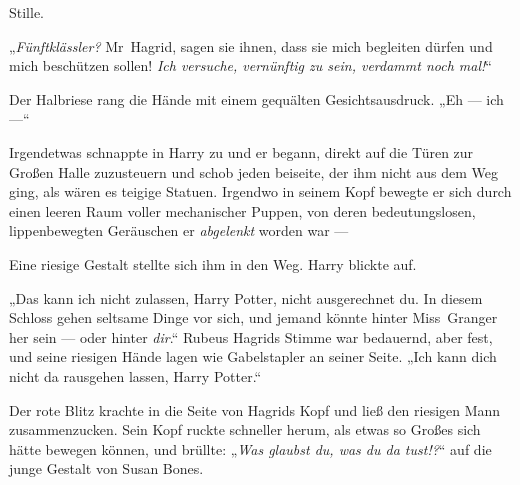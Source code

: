 Stille.

„\emph{Fünftklässler?} Mr~Hagrid, sagen sie ihnen, dass sie mich begleiten dürfen und mich beschützen sollen! \emph{Ich versuche, vernünftig zu sein, verdammt noch mal!}“

Der Halbriese rang die Hände mit einem gequälten Gesichtsausdruck.
„Eh — ich —“

Irgendetwas schnappte in Harry zu und er begann, direkt auf die Türen zur Großen Halle zuzusteuern und schob jeden beiseite, der ihm nicht aus dem Weg ging, als wären es teigige Statuen. Irgendwo in seinem Kopf bewegte er sich durch einen leeren Raum voller mechanischer Puppen, von deren bedeutungslosen, lippenbewegten Geräuschen er \emph{abgelenkt} worden war —


Eine riesige Gestalt stellte sich ihm in den Weg. Harry blickte auf.

„Das kann ich nicht zulassen, Harry Potter, nicht ausgerechnet du. In diesem Schloss gehen seltsame Dinge vor sich, und jemand könnte hinter Miss~Granger her sein — oder hinter \emph{dir}.“
Rubeus Hagrids Stimme war bedauernd, aber fest, und seine riesigen Hände lagen wie Gabelstapler an seiner Seite.
„Ich kann dich nicht da rausgehen lassen, Harry Potter.“


Der rote Blitz krachte in die Seite von Hagrids Kopf und ließ den riesigen Mann zusammenzucken. Sein Kopf ruckte schneller herum, als etwas so Großes sich hätte bewegen können, und brüllte:
„\emph{Was glaubst du, was du da tust!?}“ auf die junge Gestalt von Susan Bones.

